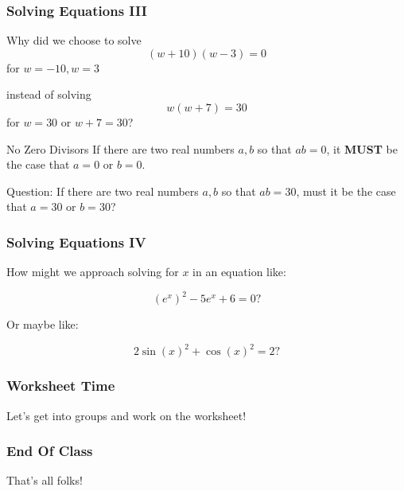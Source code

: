 \documentclass{ltx-talk}
\begin{document}
\begin{frame}
  \frametitle{Solving Equations III}
  Why did we choose to solve
  $$(w+10)(w-3) = 0$$
  for $w = -10, w = 3$

  instead of solving
  $$w(w+7)=30$$
  for $w = 30$ or $w + 7 = 30$? \pause

  \begin{alertblock}{No Zero Divisors}
    If there are two real numbers $a,b$ so that $ab = 0$, \pause
    it \textbf{MUST} be the case that $a = 0$ or $b = 0$. \pause
  \end{alertblock}

  Question: If there are two real numbers $a,b$ so that $ab = 30$,
  must it be the case that $a = 30$ or $b = 30$?
\end{frame}

\begin{frame}
  \frametitle{Solving Equations IV}

  How might we approach solving for $x$ in an equation like: \pause

  \begin{equation}
    (e^x)^2 - 5e^x + 6 = 0?
  \end{equation} \pause

  Or maybe like: \pause

  \begin{equation}
    2\sin(x)^2 + \cos(x)^2 = 2?
  \end{equation}
\end{frame}

\begin{frame}
  \frametitle{Worksheet Time}

  Let's get into groups and work on the worksheet!
\end{frame}

\begin{frame}
  \frametitle{End Of Class}

  That's all folks!
\end{frame}
\end{document}

